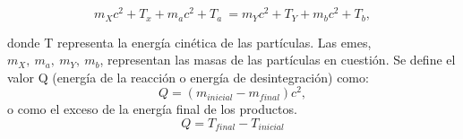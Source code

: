 \begin{equation*}
    m_Xc^2+T_x+m_ac^2+T_a\ = m_Yc^2+T_Y+m_bc^2+T_b,
\end{equation*}

\noindent donde T representa la energía cinética de las partículas. Las emes, $m_X,\ m_a,\ m_Y,\ m_b$, representan las masas de las partículas en cuestión. Se define el valor Q (energía de la reacción o energía de desintegración) como:
\begin{equation*}
    Q=(m_{inicial}-m_{final})c^2,  
\end{equation*}
\noindent o como el exceso de la energía final de los productos.
\begin{equation*}
   Q=T_{final}-T_{inicial}
\end{equation*}    
\fi